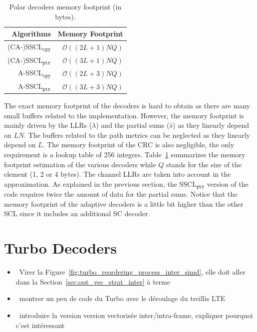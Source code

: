 \begin{table}[htp]
  \centering
  \caption{Polar decoders memory footprint (in bytes).}
  \label{tab:polar_scl_memory_footprint}
   \begin{tabular}{r r}
    \textbf{Algorithms}        & \textbf{Memory Footprint} \\
    \hline
    \hline
    (CA-)SSCL$_{\texttt{cpy}}$ & $\mathcal{O}((2L + 1)NQ)$ \\
    (CA-)SSCL$_{\texttt{ptr}}$ & $\mathcal{O}((3L + 1)NQ)$ \\
    A-SSCL$_{\texttt{cpy}}$    & $\mathcal{O}((2L + 3)NQ)$ \\
    A-SSCL$_{\texttt{ptr}}$    & $\mathcal{O}((3L + 3)NQ)$ \\
  \end{tabular}
\end{table}

The exact memory footprint of the decoders is hard to obtain as there are many
small buffers related to the implementation. However, the memory footprint is
mainly driven by the LLRs ($\lambda$) and the partial sums ($\hat{s}$) as they
linearly depend on $LN$. The buffers related to the path metrics can be
neglected as they linearly depend on $L$. The memory footprint of the CRC is
also negligible, the only requirement is a lookup table of 256 integers.
Table~\ref{tab:polar_scl_memory_footprint} summarizes the memory footprint
estimation of the various decoders while $Q$ stands for the size of the element
(1, 2 or 4 bytes). The channel LLRs are taken into account in the approximation.
As explained in the previous section, the SSCL$_{\texttt{ptr}}$ version of the
code requires twice the amount of data for the partial sums. Notice that the
memory footprint of the adaptive decoders is a little bit higher than the other
SCL since it includes an additional SC decoder.

\section{Turbo Decoders}

\begin{itemize}
  \item \xmark~Virer la Figure~\ref{fig:turbo_reordering_process_inter_simd},
    elle doit aller dans la Section~\ref{sec:opt_vec_strat_inter} à terme
  \item \xmark~montrer un peu de code du Turbo avec le déroulage du treillis LTE
  \item \xmark~introduire la version version vectorisée inter/intra-frame,
    expliquer pourquoi c'est intéressant
\end{itemize}

